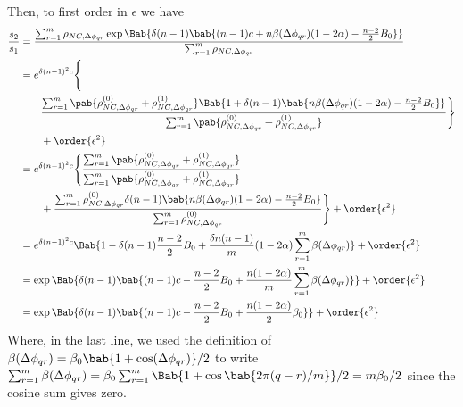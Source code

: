 Then, to first order in $\epsilon$
we have
\begin{align*}
  \frac{s_2}{s_1}
  &=
  \frac
  {\sum_{r=1}^{m} \rho_{NC,\Delta \phi_{qr}}
    \exp \Bab{
      \delta (n-1)
      \bab{
        (n-1) c + n \beta(\Delta \phi_{qr}) (1 - 2 \alpha)
        - \frac{n-2}{2} B_0
      }
    }
  }
  {\sum_{r=1}^{m} \rho_{NC,\Delta \phi_{qr}}}
  \\
  &=
  e^{\delta (n-1)^2 c}
  \Biggl\{
  \\
  &\qquad
  \frac
  {\sum_{r=1}^{m}
    \pab{
      \rho_{NC,\Delta \phi_{qr}}^{(0)}
      +
      \rho_{NC,\Delta \phi_{qr}}^{(1)}
    }
    \Bab{1 +
      \delta (n-1)
      \bab{
        n \beta(\Delta \phi_{qr}) (1 - 2 \alpha)
        - \frac{n-2}{2} B_0
      }
    }
  }
  {\sum_{r=1}^{m} \pab{
    \rho_{NC,\Delta \phi_{qr}}^{(0)}
    +
    \rho_{NC,\Delta \phi_{qr}}^{(1)}
  }}
  \Biggr\}
  \\
  &\qquad
  + \order{\epsilon^2}
  \\
  &=
  e^{\delta (n-1)^2 c}
  \Biggl\{
  \frac
  {\sum_{r=1}^{m}
    \pab{
      \rho_{NC,\Delta \phi_{qr}}^{(0)}
      +
      \rho_{NC,\Delta \phi_{qr}}^{(1)}
    }
  }
  {\sum_{r=1}^{m} \pab{
    \rho_{NC,\Delta \phi_{qr}}^{(0)}
    +
    \rho_{NC,\Delta \phi_{qr}}^{(1)}
  }}
  \\
  &\qquad
  +
  \frac
  {\sum_{r=1}^{m} \rho_{NC,\Delta \phi_{qr}}^{(0)}
    \delta (n-1)
    \bab{
      n \beta(\Delta \phi_{qr}) (1 - 2 \alpha)
      - \frac{n-2}{2} B_0
    }
  }
  {\sum_{r=1}^{m} \rho_{NC,\Delta \phi_{qr}}^{(0)}
  }
  \Biggr\}
  + \order{\epsilon^2}
  \\
  &=
  e^{\delta (n-1)^2 c}
  \Bab{
    1
    - \delta (n-1) \frac{n-2}{2} B_0
    +
    \frac{\delta n (n-1)}{m} (1 - 2 \alpha)
    \sum_{r=1}^{m} \beta(\Delta \phi_{qr})
  }
  + \order{\epsilon^2}
  \\
  &=
  \exp \Bab{\delta (n-1) \bab{
    (n-1) c
    - \frac{n-2}{2} B_0
    +
    \frac{n (1 - 2 \alpha)}{m}
    \sum_{r=1}^{m} \beta(\Delta \phi_{qr})
  }}
  + \order{\epsilon^2}
  \\
  &=
  \exp \Bab{ \delta (n-1) \bab{
    (n-1) c
    - \frac{n-2}{2} B_0
    +
    \frac{n (1 - 2 \alpha)}{2} \beta_0
  }}
  + \order{\epsilon^2}
\end{align*}
Where, in the last line, we used
the definition of
$\beta(\Delta \phi_{qr}) = \beta_0 \bab{1 + \cos(\Delta \phi_{qr})}/2$
to write
$\sum_{r=1}^m \beta(\Delta \phi_{qr})
= \beta_0 \sum_{r=1}^m \Bab{1 + \cos\bab{2 \pi (q-r)/m}}/2
= m \beta_0/2$
since the cosine sum gives zero.

